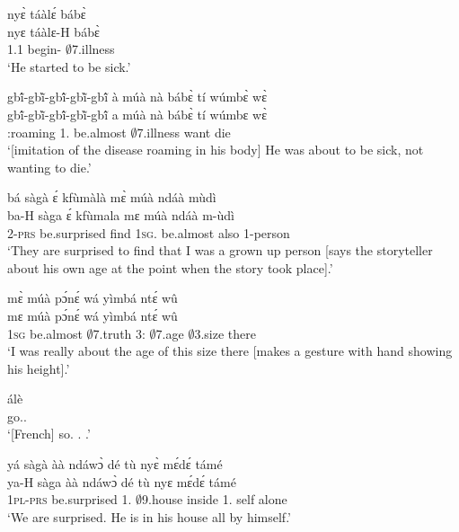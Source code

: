 \begin{exe}[(A34)]
\exA\label{a07}
  \glll  nyɛ̀ táàlɛ́ bábɛ̀    \\
          nyɛ táàlɛ-H bábɛ̀  \\
          1.{\PST}1 begin-{\R} $\emptyset$7.illness       \\
    \trans `He started to be sick.'
 
\exA\label{a08} 
  \glll  gbĩ́-gbĩ̀-gbĩ́-gbĩ̀-gbĩ́  à múà nà bábɛ̀ tí wúmbɛ̀ wɛ̀\\
            gbĩ́-gbĩ̀-gbĩ́-gbĩ̀-gbĩ́  a múà nà bábɛ̀ tí wúmbɛ wɛ̀\\
         {\IDEO}:roaming 1.{\PST} be.almost {\COM} $\emptyset$7.illness {\NEG} want die\\
    \trans `[imitation of the disease roaming in his body] He was about to be sick, not wanting to die.'
 
\exA\label{a09}
  \glll   bá sàgà ɛ́ kfùmàlà mɛ̀ múà ndáà mùdì   \\
         ba-H sàga ɛ́ kfùmala mɛ múà ndáà m-ùdì\\
         2-\textsc{prs} be.surprised {\LOC} find 1\textsc{sg}.{\SBJ}  be.almost also {\N}1-person\\
    \trans `They are surprised to find that I was a grown up person [says the storyteller about his own age at the point when the story took place].'
 
\exA\label{a10}
  \glll mɛ̀ múà pɔ́nɛ́ wá yìmbá ntɛ́ wû  \\
          mɛ múà pɔ́nɛ́ wá yìmbá ntɛ́ wû       \\
         1\textsc{sg} be.almost $\emptyset$7.truth 3:{\ATT}  $\emptyset$7.age $\emptyset$3.size there \\
    \trans `I was really about the age of this size there [makes a gesture with hand showing his height].'
 
\exA\label{a11}
  \gll   álè   \\
           go.{\IMP}.{\PL}       \\
    \trans `[French] so. . .'
 
\exA\label{a12}
  \glll   yá sàgà àà ndáwɔ̀ dé tù nyɛ̀ mɛ́dɛ́ támé   \\
           ya-H sàga àà ndáwɔ̀ dé tù nyɛ mɛ́dɛ́ támé      \\
          1\textsc{pl}-\textsc{prs} be.surprised 1.{\COP} $\emptyset$9.house {\LOC} inside 1.{\SBJ} self alone \\
    \trans `We are surprised. He is in his house all by himself.'
 

\end{exe}
